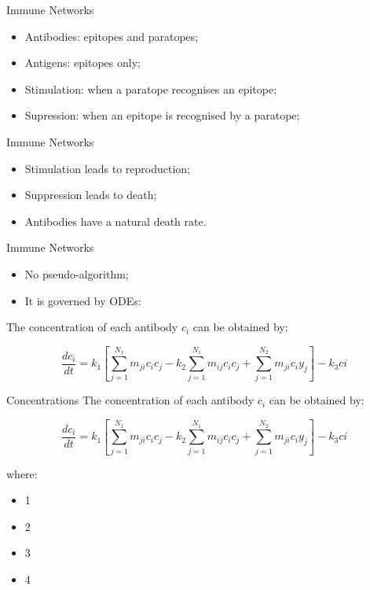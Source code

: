 \documentclass[xcolor=svgnames]{beamer}
\begin{document}
    \begin{frame}{Immune Networks}
        \begin{itemize}
            \item Antibodies: epitopes and paratopes;
            \item Antigens: epitopes only;
            \item Stimulation: when a paratope recognises an epitope;
            \item Supression: when an epitope is recognised by a paratope;
        \end{itemize}
    \end{frame}
    
    \begin{frame}{Immune Networks}
        \begin{itemize}
            \item Stimulation leads to reproduction;
            \item Suppression leads to death;
            \item Antibodies have a natural death rate.
        \end{itemize}
    \end{frame}    
    
    \begin{frame}{Immune Networks}
        \begin{itemize}
            \item No pseudo-algorithm;
            \item It is governed by ODEs:
        \end{itemize}
        
        The concentration of each antibody $c_{i}$ can be obtained by:
        
        $$ \frac{dc_{i}}{dt} = k_{1} \left[ \sum^{N_{1}}_{j=1}{m_{ji}c_{i}c_{j}} - k_{2} \sum^{N_{1}}_{j=1}{m_{ij}c_{i}c_{j}} + \sum^{N_{2}}_{j=1}{m_{ji}c_{i}y_{j}} \right] - k_{3}c{i} $$
        
    \end{frame}
    
    \begin{frame}{Concentrations}
        The concentration of each antibody $c_{i}$ can be obtained by:
        
        $$ \frac{dc_{i}}{dt} = k_{1} \left[ \sum^{N_{1}}_{j=1}{m_{ji}c_{i}c_{j}} - k_{2} \sum^{N_{1}}_{j=1}{m_{ij}c_{i}c_{j}} + \sum^{N_{2}}_{j=1}{m_{ji}c_{i}y_{j}} \right] - k_{3}c{i} $$
        
        where:
        
        \begin{itemize}
            \item 1
            \item 2
            \item 3
            \item 4
        \end{itemize}
        
    \end{frame}
    
\end{document}

